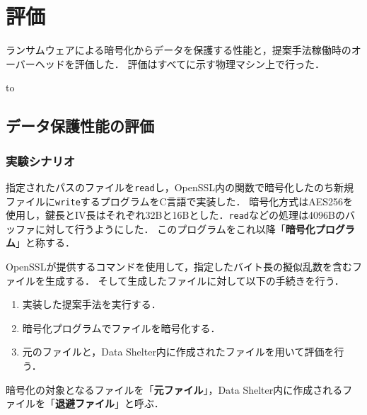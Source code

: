\chapter{評価}
\label{chap:eval}
ランサムウェアによる暗号化からデータを保護する性能と，提案手法稼働時のオーバーヘッドを評価した．
評価はすべてに示す物理マシン上で行った．
\begin{table}[t]
  \caption{Environment of the physical machine used for the evaluation.}
  \label{tab:experiment-machine-kashiwa}
  \hbox to
\end{table}

\section{データ保護性能の評価}
\subsection{実験シナリオ}
指定されたパスのファイルを\texttt{read}し，OpenSSL内の関数で暗号化したのち新規ファイルに\texttt{write}するプログラムをC言語で実装した．
暗号化方式はAES256を使用し，鍵長とIV長はそれぞれ32Bと16Bとした．\texttt{read}などの処理は4096Bのバッファに対して行うようにした．
このプログラムをこれ以降「\textbf{暗号化プログラム}」と称する．

OpenSSLが提供するコマンドを使用して，指定したバイト長の擬似乱数を含むファイルを生成する．
そして生成したファイルに対して以下の手続きを行う．
\begin{enumerate}
  \item 実装した提案手法を実行する．
  \item 暗号化プログラムでファイルを暗号化する．
  \item 元のファイルと，Data Shelter内に作成されたファイルを用いて評価を行う．
\end{enumerate}
暗号化の対象となるファイルを「\textbf{元ファイル}」，Data Shelter内に作成されるファイルを「\textbf{退避ファイル}」と呼ぶ．

